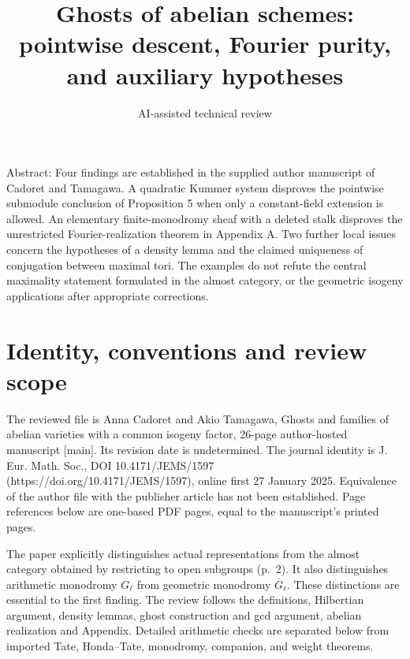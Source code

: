 \documentclass[10pt]{article}
\title{Ghosts of abelian schemes: pointwise descent, Fourier purity, and auxiliary hypotheses}
\author{AI-assisted technical review}
\date{}
\begin{document}
\maketitle
Abstract: Four findings are established in the supplied author manuscript of Cadoret and Tamagawa. A quadratic Kummer system disproves the pointwise submodule conclusion of Proposition 5 when only a constant-field extension is allowed. An elementary finite-monodromy sheaf with a deleted stalk disproves the unrestricted Fourier-realization theorem in Appendix A. Two further local issues concern the hypotheses of a density lemma and the claimed uniqueness of conjugation between maximal tori. The examples do not refute the central maximality statement formulated in the almost category, or the geometric isogeny applications after appropriate corrections.\par
\section*{Identity, conventions and review scope}
The reviewed file is Anna Cadoret and Akio Tamagawa, Ghosts and families of abelian varieties with a common isogeny factor, 26-page author-hosted manuscript [main]. Its revision date is undetermined. The journal identity is J. Eur. Math. Soc., DOI 10.4171/JEMS/1597 (https://doi.org/10.4171/JEMS/1597), online first 27 January 2025. Equivalence of the author file with the publisher article has not been established. Page references below are one-based PDF pages, equal to the manuscript’s printed pages.\par
The paper explicitly distinguishes actual representations from the almost category obtained by restricting to open subgroups (p. 2). It also distinguishes arithmetic monodromy \(G_\ell\) from geometric monodromy \(\overline G_\ell\). These distinctions are essential to the first finding. The review follows the definitions, Hilbertian argument, density lemmas, ghost construction and gcd argument, abelian realization and Appendix. Detailed arithmetic checks are separated below from imported Tate, Honda–Tate, monodromy, companion, and weight theorems.\par
\end{document}
